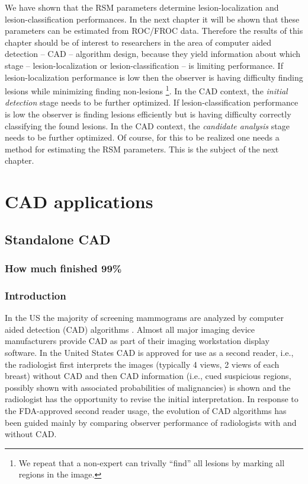 \documentclass[
]{book}
\begin{document}
We have shown that the RSM parameters determine lesion-localization and lesion-classification performances. In the next chapter it will be shown that these parameters can be estimated from ROC/FROC data. Therefore the results of this chapter should be of interest to researchers in the area of computer aided detection -- CAD -- algorithm design, because they yield information about which stage -- lesion-localization or lesion-classification -- is limiting performance. If lesion-localization performance is low then the observer is having difficulty finding lesions while minimizing finding non-lesions \footnote{We repeat that a non-expert can trivally ``find'' all lesions by marking all regions in the image.}. In the CAD context, the \emph{initial detection} stage needs to be further optimized. If lesion-classification performance is low the observer is finding lesions efficiently but is having difficulty correctly classifying the found lesions. In the CAD context, the \emph{candidate analysis} stage needs to be further optimized. Of course, for this to be realized one needs a method for estimating the RSM parameters. This is the subject of the next chapter.

\hypertarget{part-cad-applications}{%
\part*{CAD applications}\label{part-cad-applications}}

\hypertarget{standalone-cad-radiologists}{%
\chapter{Standalone CAD}\label{standalone-cad-radiologists}}

\hypertarget{standalone-cad-radiologists-how-much-finished}{%
\section{How much finished 99\%}\label{standalone-cad-radiologists-how-much-finished}}

\hypertarget{standalone-cad-radiologists-introduction}{%
\section{Introduction}\label{standalone-cad-radiologists-introduction}}

In the US the majority of screening mammograms are analyzed by computer aided detection (CAD) algorithms \citep{rao2010widely}. Almost all major imaging device manufacturers provide CAD as part of their imaging workstation display software. In the United States CAD is approved for use as a second reader, i.e., the radiologist first interprets the images (typically 4 views, 2 views of each breast) without CAD and then CAD information (i.e., cued suspicious regions, possibly shown with associated probabilities of malignancies) is shown and the radiologist has the opportunity to revise the initial interpretation. In response to the FDA-approved second reader usage, the evolution of CAD algorithms has been guided mainly by comparing observer performance of radiologists with and without CAD.
\end{document}
